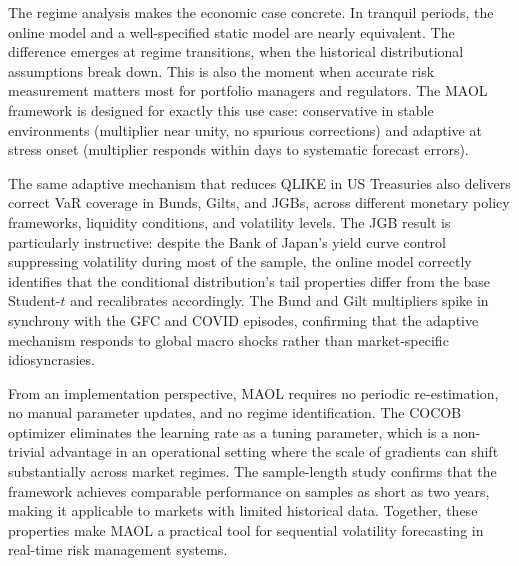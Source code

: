 The regime analysis makes the economic case concrete. In tranquil periods, the online model
and a well-specified static model are nearly equivalent. The difference emerges at regime
transitions, when the historical distributional assumptions break down. This is also the moment
when accurate risk measurement matters most for portfolio managers and regulators. The MAOL
framework is designed for exactly this use case: conservative in stable environments (multiplier
near unity, no spurious corrections) and adaptive at stress onset (multiplier responds within
days to systematic forecast errors).

The same adaptive mechanism that reduces QLIKE in US Treasuries also delivers correct VaR
coverage in Bunds, Gilts, and JGBs, across different monetary policy frameworks, liquidity
conditions, and volatility levels. The JGB result is particularly instructive: despite the
Bank of Japan's yield curve control suppressing volatility during most of the sample, the
online model correctly identifies that the conditional distribution's tail properties differ
from the base Student-$t$ and recalibrates accordingly. The Bund and Gilt multipliers spike
in synchrony with the GFC and COVID episodes, confirming that the adaptive mechanism responds
to global macro shocks rather than market-specific idiosyncrasies.

From an implementation perspective, MAOL requires no periodic re-estimation, no manual
parameter updates, and no regime identification. The COCOB optimizer eliminates the learning
rate as a tuning parameter, which is a non-trivial advantage in an operational setting where
the scale of gradients can shift substantially across market regimes. The sample-length study
confirms that the framework achieves comparable performance on samples as short as two years,
making it applicable to markets with limited historical data. Together, these properties
make MAOL a practical tool for sequential volatility forecasting in real-time risk management
systems.
